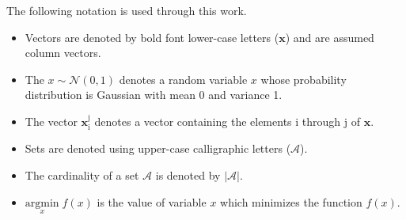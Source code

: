 %
The following notation is used through this work. \par
\begin{itemize}
\item 
Vectors are denoted by bold font lower-case letters ($\mathbf{x}$) and are assumed column vectors.
\item 
The $x \sim \mathcal{N}(0,1)$ denotes a random variable $x$ whose probability distribution is Gaussian with mean 0 and variance 1.
\item 
The vector $\mathbf{x}_{\mathrm{i}}^{\mathrm{j}}$ denotes a vector containing the elements i through j of $\mathbf{x}$.
\item Sets are denoted using upper-case calligraphic letters ($\mathcal{A}$).
\item The cardinality of a set $\mathcal{A}$ is denoted by $|\mathcal{A}|$.
\item $\underset{x}{\text{argmin}} \; f(x)$ is the value of variable $x$ which minimizes the function $f(x)$.
\end{itemize}

\clearpage
